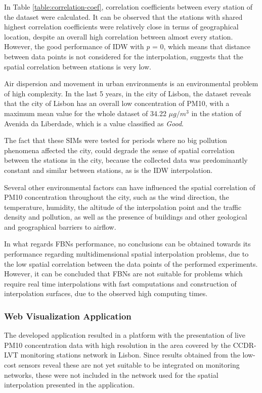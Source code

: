 In Table \ref{table:correlation-coef}, correlation coefficients between every station of the dataset were calculated. It can be observed that the stations with shared highest correlation coefficients were relatively close in terms of geographical location, despite an overall high correlation between almost every station. However, the good performance of IDW with \textit{p} = 0, which means that distance between data points is not considered for the interpolation, suggests that the spatial correlation between stations is very low.

Air dispersion and movement in urban environments is an environmental problem of high complexity. In the last 5 years, in the city of Lisbon, the dataset reveals that the city of Lisbon has an overall low concentration of PM10, with a maximum mean value for the whole dataset of 34.22 $\mu g/m^3$ in the station of Avenida da Liberdade, which is a value classified as \textit{Good}.

The fact that these SIMs were tested for periods where no big pollution phenomena affected the city, could degrade the sense of spatial correlation between the stations in the city, because the collected data was predominantly constant and similar between stations, as is the IDW interpolation.

Several other environmental factors can have influenced the spatial correlation of PM10 concentration throughout the city, such as the wind direction, the temperature, humidity, the altitude of the interpolation point and the traffic density and pollution, as well as the presence of buildings and other geological and geographical barriers to airflow.

In what regards FBNs performance, no conclusions can be obtained towards its performance regarding multidimensional spatial interpolation problems, due to the low spatial correlation between the data points of the performed experiments. However, it can be concluded that FBNs are not suitable for problems which require real time interpolations with fast computations and construction of interpolation surfaces, due to the observed high computing times.

\subsubsection{Web Visualization Application}

The developed application resulted in a platform with the presentation of live PM10 concentration data with high resolution in the area covered by the CCDR-LVT monitoring stations network in Lisbon. Since results obtained from the low-cost sensors reveal these are not yet suitable to be integrated on monitoring networks, these were not included in the network used for the spatial interpolation presented in the application.

